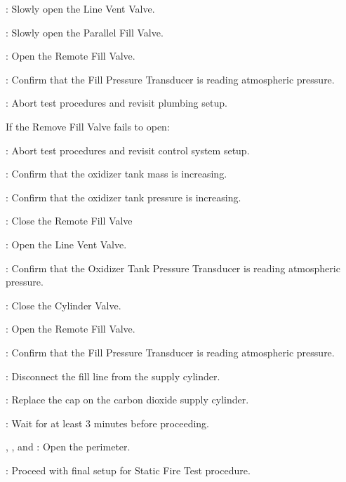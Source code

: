 \begin{checklist}
\begin{checklist}[label=$\bullet$]
\begin{checklist}
            \item \primary{}: Slowly open the Line Vent Valve.
            \item \primary{}: Slowly open the Parallel Fill Valve.
            \item \control{}: Open the Remote Fill Valve.
            \item \daq{}: Confirm that the Fill Pressure Transducer is reading atmospheric pressure.
            \item \ops{}: Abort test procedures and revisit plumbing setup.
        \end{checklist}
        \item If the Remove Fill Valve fails to open:
        \begin{checklist}
            \item \ops{}: Abort test procedures and revisit control system setup.
        \end{checklist}
    \end{checklist}
    \item \daq{}: Confirm that the oxidizer tank mass is increasing.
    \item \daq{}: Confirm that the oxidizer tank pressure is increasing.
    \item \control{}: Close the Remote Fill Valve
    \item \primary{}: Open the Line Vent Valve.
    \item \daq{}: Confirm that the Oxidizer Tank Pressure Transducer is reading atmospheric pressure.
    \item \primary{}: Close the Cylinder Valve.
    \item \control{}: Open the Remote Fill Valve.
    \item \daq{}: Confirm that the Fill Pressure Transducer is reading atmospheric pressure.
    \item \primary{}: Disconnect the fill line from the supply cylinder.
    \item \primary{}: Replace the cap on the carbon dioxide supply cylinder.
    \item \ops{}: Wait for at least 3 minutes before proceeding.
    \item \peri{}, \perii{}, and \periii{}: Open the perimeter.
    \item \ops{}: Proceed with final setup for Static Fire Test procedure. 
\end{checklist}
\setcounter{checklistnum}{0}
\newpage

